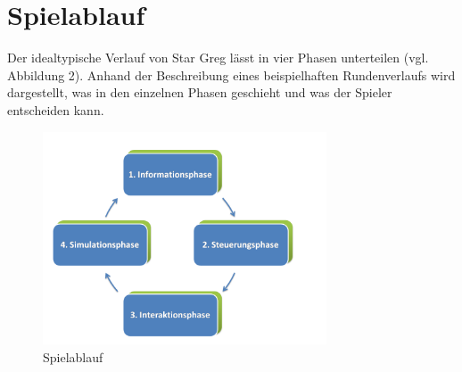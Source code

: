 \section{Spielablauf}
\label{sec:spielwelt-regeln}


Der idealtypische Verlauf von Star Greg lässt in vier Phasen unterteilen (vgl. Abbildung 2). Anhand der Beschreibung eines beispielhaften Rundenverlaufs wird dargestellt, was in den einzelnen Phasen geschieht und was der Spieler entscheiden kann.

\begin{figure}[htb]
\centering
\includegraphics[width=0.75\textwidth]{20_Spielwelt/40_Regeln_Ablauf/Spielablauf.png}
\caption{Spielablauf}
\end{figure}









\autorende{}